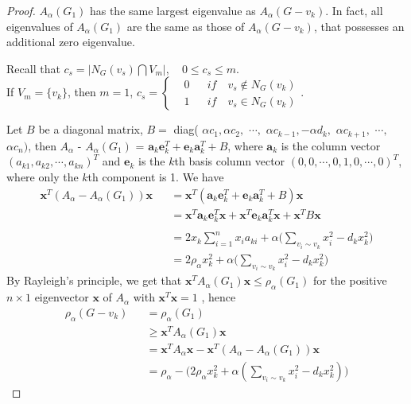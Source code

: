 \documentclass[amsthm]{elsart}
\begin{document}
\begin{proof}
$A_\alpha(G_1)$ has the same largest eigenvalue as $A_\alpha(G - v_k)$. In fact, all eigenvalues of $A_\alpha(G_1)$ are the same as those of
$A_\alpha(G - v_k)$, that possesses an additional zero eigenvalue.

Recall that $ c_s = |N_G(v_s) \bigcap V_m|, \quad 0\leqslant c_s \leqslant m$.
\\ If $V_m = \{v_k\}$, then $m = 1$,
$
c_s =
\left\{
\begin{aligned}
&0    && if \quad v_s \notin N_G(v_k) \\
&1    && if \quad v_s \in N_G(v_k)
\end{aligned}
\right.
$.

Let $B$ be a diagonal matrix, $B =$ diag(
$\alpha c_1, \alpha c_2, $ $ \cdots,$ $ \alpha c_{k-1}, - \alpha d_{k}, $ $ \alpha c_{k+1},$ $  \cdots, $ $\alpha c_n )$,
 then $A_\alpha$ - $A_\alpha(G_1)$ = $\textbf{a}_k\textbf{e}_k^T + \textbf{e}_k\textbf{a}_k^T + B$, where $\textbf{a}_k$ is the column vector $(a_{k1}, a_{k2}, \cdots , a_{kn})^T$ and $\textbf{e}_k$ is the $k$th basis column vector $(0, 0, \cdots , 0, 1, 0, \cdots , 0)^T$,
 where only the $k$th component is 1. We have
\begin{eqnarray*}
\textbf{x}^T(A_\alpha - A_\alpha(G_1))\textbf{x}
&&= \textbf{x}^T (\textbf{a}_k \textbf{e}_k^T + \textbf{e}_k \textbf{a}_k^T + B) \textbf{x}
\\ &&= \textbf{x}^T \textbf{a}_k \textbf{e}_k^T \textbf{x} + \textbf{x}^T \textbf{e}_k \textbf{a}_k^T \textbf{x} + \textbf{x}^T B \textbf{x} \\
\\ &&= 2x_k \sum \limits_{i=1}^{n}x_ia_{ki} + \alpha \big(\sum \limits_{v_i \sim v_k}^{} x_i^2 - d_k x_k^2 \big)
\\ &&= 2 \rho_\alpha x_k^2 + \alpha \big(\sum \limits_{v_i \sim v_k}^{} x_i^2 - d_k x_k^2 \big)
\end{eqnarray*}
\qquad By Rayleigh's principle, we get that  $\textbf{x}^{T}A_\alpha(G_1)\textbf{x}  \leqslant  \rho_\alpha(G_1)$ for the positive $n \times 1$ eigenvector $\textbf{x}$ of $A_\alpha$ with $\textbf{x}^{T} \textbf{x} = 1$
, hence
\begin{eqnarray}
\nonumber \rho_\alpha(G - v_k)
&&= \rho_\alpha(G_1)
\\ \nonumber &&\geqslant \textbf{x}^T A_\alpha(G_1) \textbf{x}
\\ \nonumber &&= \textbf{x}^T A_\alpha \textbf{x} - \textbf{x}^T(A_\alpha - A_\alpha(G_1))\textbf{x}
\\ \nonumber &&= \rho_\alpha - \Big( 2 \rho_\alpha x_k^2 + \alpha (\sum \limits_{v_i \sim v_k}^{} x_i^2 - d_k x_k^2 )\Big)

\end{eqnarray}
\end{proof}
\end{document}
